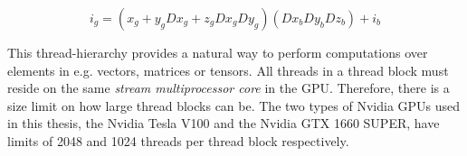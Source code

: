 \begin{equation}
  i_g = (x_g + y_gDx_g + z_gDx_gDy_g)(Dx_bDy_bDz_b) + i_b
\end{equation}

This thread-hierarchy provides a natural way to perform computations over elements in e.g. vectors, matrices or tensors.
All threads in a thread block must reside on the same \textit{stream multiprocessor core} in the GPU.
Therefore, there is a size limit on how large thread blocks can be.
The two types of Nvidia GPUs used in this thesis, the Nvidia Tesla V100 and the Nvidia GTX 1660 SUPER, have limits of 2048 and 1024 threads per thread block respectively.


